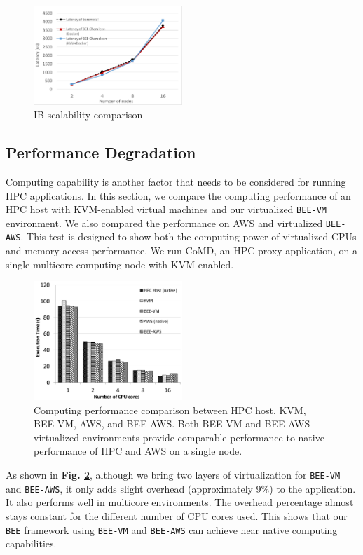 \begin{figure}[h]
    \centering
    \includegraphics[width=0.5\textwidth]{figures/ib-scaliability.pdf}
    \caption{IB scalability comparison}
    \label{ib-scaliability}
\end{figure}

\subsection{Performance Degradation}
Computing capability is another factor that needs to be considered for running HPC applications. In this section, we compare the computing performance of an HPC host with KVM-enabled virtual machines and our virtualized \texttt{BEE-VM} environment. We also compared the performance on AWS and virtualized \texttt{BEE-AWS}. This test is designed to show both the computing power of virtualized CPUs and memory access performance.  We run CoMD\cite{comd}, an HPC proxy application, on a single multicore computing node with KVM enabled.

\begin{figure}[h]
    \centering
    \includegraphics[width=0.5\textwidth]{figures/lu.pdf}
    \caption{Computing performance comparison between HPC host, KVM, BEE-VM, AWS, and BEE-AWS. Both BEE-VM and BEE-AWS virtualized environments provide comparable performance to native performance of HPC and AWS on a single node.}
    \label{comp-test}
\end{figure}
 As shown in \textbf{Fig. \ref{comp-test}}, although we bring two layers of virtualization for \texttt{BEE-VM} and \texttt{BEE-AWS}, it only adds slight overhead (approximately 9\%) to the application. It also performs well in multicore environments. The overhead percentage almost stays constant for the different number of CPU cores used. This shows that our \texttt{BEE} framework using \texttt{BEE-VM} and \texttt{BEE-AWS} can achieve near native computing capabilities. 
